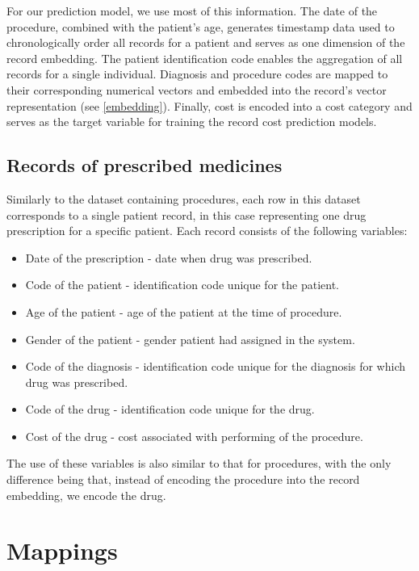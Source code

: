 For our prediction model, we use most of this information. The date of the procedure, combined with the patient’s age, generates timestamp data used to chronologically order all records for a patient and serves as one dimension of the record embedding. The patient identification code enables the aggregation of all records for a single individual. Diagnosis and procedure codes are mapped to their corresponding numerical vectors and embedded into the record’s vector representation (see \ref{embedding}). Finally, cost is encoded into a cost category and serves as the target variable for training the record cost prediction models.

\subsection{Records of prescribed medicines}

Similarly to the dataset containing procedures, each row in this dataset corresponds to a single patient record, in this case representing one drug prescription for a specific patient. Each record consists of the following variables:

\begin{itemize}
	\item Date of the prescription - date when drug was prescribed.
	\item Code of the patient - identification code unique for the patient.
	\item Age of the patient - age of the patient at the time of procedure.
	\item Gender of the patient - gender patient had assigned in the system.
	\item Code of the diagnosis - identification code unique for the diagnosis for which drug was prescribed.
	\item Code of the drug - identification code unique for the drug.
	\item Cost of the drug - cost associated with performing of the procedure.
\end{itemize}

The use of these variables is also similar to that for procedures, with the only difference being that, instead of encoding the procedure into the record embedding, we encode the drug.

\section{Mappings}

